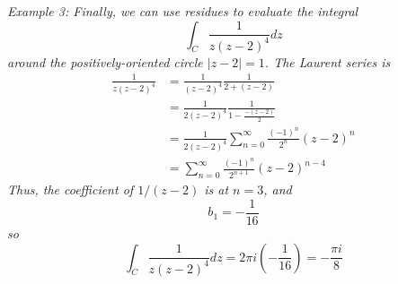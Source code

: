 \documentclass{article}
\begin{document}
\textit{Example 3: Finally, we can use residues to evaluate the integral
\[
	\int_C \frac{1}{z(z - 2)^4} dz
\]
around the positively-oriented circle $|z - 2| = 1$. The Laurent series is
\begin{align*}
	\frac{1}{z(z - 2)^4}
	&= \frac{1}{(z - 2)^4} \frac{1}{2 + (z - 2)} \\
	&= \frac{1}{2(z - 2)^4} \frac{1}{1 - \frac{-(z - 2)}{2}} \\
	&= \frac{1}{2(z - 2)^4} \sum_{n=0}^\infty \frac{(-1)^n}{2^n} (z - 2)^n \\
	&= \sum_{n=0}^\infty \frac{(-1)^n}{2^{n+1}} (z - 2)^{n-4}
\end{align*}
Thus, the coefficient of $1 / (z - 2)$ is at $n = 3$, and
\[
	b_1 = -\frac{1}{16}
\]
so
\[
	\int_C \frac{1}{z(z - 2)^4} dz = 2\pi i\left(-\frac{1}{16}\right) 
	= -\frac{\pi i}{8}
\]}
\end{document}

